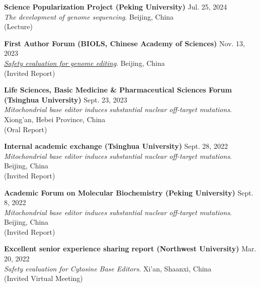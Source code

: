 \textbf{Science Popularization Project (Peking University)} \hfill Jul. 25, 2024 \\
{\small \textit{The development of genome sequencing}. \hfill Beijing, China\\ (Lecture)}

\vspace{5pt}

\textbf{First Author Forum (BIOLS, Chinese Academy of Sciences)} \hfill Nov. 13, 2023\\
{\small \textit{\href{http://www.biols.cas.cn/xwdt/zhxw/202311/t20231120_6935705.html}{Safety evaluation for genome editing}}. \hfill Beijing, China\\ (Invited Report)}

\vspace{5pt}

\textbf{Life Sciences, Basic Medicine \& Pharmaceutical Sciences Forum (Tsinghua University)} \hfill Sept. 23, 2023\\
{\small \textit{Mitochondrial base editor induces substantial nuclear off-target mutations}. \hfill Xiong'an, Hebei Province, China\\(Oral Report)}

\vspace{5pt}

\textbf{Internal academic exchange (Tsinghua University)} \hfill Sept. 28, 2022\\
{\small \textit{Mitochondrial base editor induces substantial nuclear off-target mutations}. \hfill Beijing, China\\ (Invited Report)}

\vspace{5pt}

\textbf{Academic Forum on Molecular Biochemistry (Peking University)} \hfill Sept. 8, 2022\\
{\small \textit{Mitochondrial base editor induces substantial nuclear off-target mutations}. \hfill Beijing, China\\ (Invited Report)}

\vspace{5pt}

\textbf{Excellent senior experience sharing report (Northwest University)} \hfill Mar. 20, 2022\\
{\small \textit{Safety evaluation for Cytosine Base Editors}. \hfill Xi’an, Shaanxi, China\\ (Invited Virtual Meeting)}

